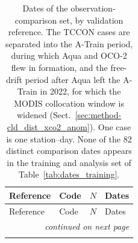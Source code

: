 \begin{longtable}{@{}llcp{}@{}}
\caption{Dates of the observation-comparison set, by validation reference. The
TCCON cases are separated into the A-Train period, during which Aqua and OCO-2
flew in formation, and the free-drift period after Aqua left the A-Train in
2022, for which the MODIS collocation window is widened
(Sect.~\ref{sec:method-cld_dist_xco2_anom}). One case is one station--day.
None of the 82 distinct comparison dates appears in the training and analysis
set of Table~\ref{tab:dates_training}.}
\label{tab:dates_comparison}\\
\toprule
Reference & Code & $N$ & Dates \\
\midrule
\endfirsthead
\toprule
Reference & Code & $N$ & Dates \\
\midrule
\endhead
\midrule \multicolumn{4}{r}{\emph{continued on next page}} \\
\endfoot
\bottomrule
\endlastfoot


\end{longtable}

